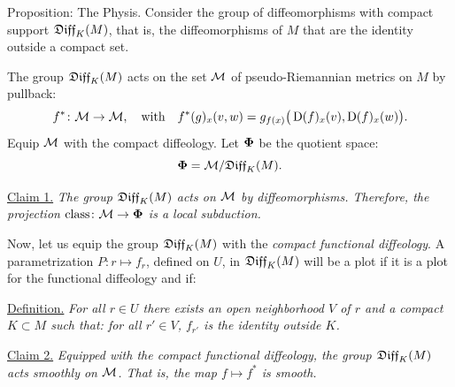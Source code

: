 \begin{Article}{Proposition: The Physis.}{}
  Consider the group of diffeomorphisms with compact support $\mathfrak{Diff}_K(M)$,
  that is,
  the diffeomorphisms of $M$ that are the identity outside a compact set.
  
  The group $\mathfrak{Diff}_K(M)$ acts on the set $\mathcal{M}$ of pseudo-Riemannian metrics on $M$ by pullback:
  $$
    f^* \colon \mathcal{M} \to \mathcal{M},
    \quad \text{with} \quad
    f^*(g)_x(v,w) = g_{f(x)}\big(\operatorname{D}(f)_x(v),\operatorname{D}(f)_x(w)\big).
  $$
  Equip $\mathcal{M}$ with the compact diffeology.
  Let ${\mbox{\boldmath $\Phi$}}$ be the quotient space:
  $$
    {\mbox{\boldmath $\Phi$}} = \mathcal{M}/\mathfrak{Diff}_K(M).
  $$
  
  \uline{Claim 1.} {\itshape The group $\mathfrak{Diff}_K(M)$ acts on $\mathcal{M}$ by diffeomorphisms.
  Therefore,
  the projection $\operatorname{class} \colon \mathcal{M} \to {\mbox{\boldmath $\Phi$}}$ is a local subduction.}
  
  Now,
  let us equip the group $\mathfrak{Diff}_K(M)$ with the \emph{compact functional diffeology}.
  A parametrization $P \colon r \mapsto f_r$,
  defined on $U$,
  in $\mathfrak{Diff}_K(M)$ will be a plot if it is a plot for the functional diffeology and if:
  
  \uline{Definition.} {\itshape For all $r \in U$ there exists an open neighborhood $V$ of $r$ and a compact $K \subset M$ such that:
  for all $r' \in V$,
  $f_{r'}$ is the identity outside $K$.}
  
  \uline{Claim 2.} {\itshape Equipped with the compact functional diffeology,
  the group $\mathfrak{Diff}_K(M)$ acts smoothly on $\mathcal{M}$.
  That is,
  the map $f \mapsto f^*$ is smooth.}
\end{Article}

